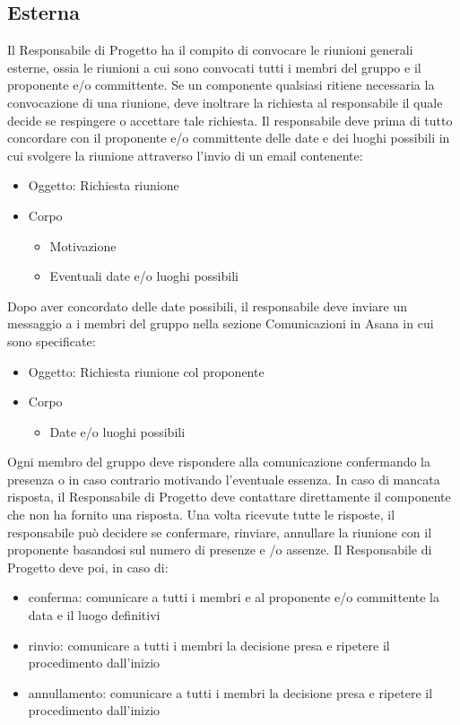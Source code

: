 \documentclass[a4paper]{report}
\begin{document}
		\subsection{Esterna}
			Il Responsabile di Progetto ha il compito di convocare le riunioni generali esterne, ossia
			le riunioni a cui sono convocati tutti i membri del gruppo e il proponente e/o committente.
			Se un componente qualsiasi ritiene necessaria la convocazione di una riunione, deve
			inoltrare la richiesta al responsabile il quale decide se respingere o accettare
			tale richiesta.
			Il responsabile deve prima di tutto concordare con il proponente e/o committente delle date e dei luoghi
			possibili in cui svolgere la riunione attraverso l'invio di un email contenente:
			\begin{itemize}
				\item Oggetto: Richiesta riunione
				\item Corpo
				\begin{itemize}
					\item Motivazione
					\item Eventuali date e/o luoghi possibili
				\end{itemize}
			\end{itemize}
			Dopo aver concordato delle date possibili, il responsabile deve inviare un messaggio a
			i membri del gruppo nella sezione Comunicazioni in Asana in cui sono specificate:
			\begin{itemize}
				\item Oggetto: Richiesta riunione col proponente
				\item Corpo
				\begin{itemize}
					\item Date e/o luoghi possibili
				\end{itemize}
			\end{itemize}
			Ogni membro del gruppo deve rispondere alla comunicazione confermando la presenza o in
			caso contrario motivando l'eventuale essenza. In caso di mancata risposta, il Responsabile
			di Progetto deve contattare direttamente il componente che non ha fornito una risposta.
			Una volta ricevute tutte le risposte, il responsabile può decidere se confermare, rinviare,
			annullare la riunione con il proponente basandosi sul numero di presenze e /o assenze.
			Il Responsabile di Progetto deve poi, in caso di:
			\begin{itemize}
				\item conferma: comunicare a tutti i membri e al proponente e/o committente la data e il luogo definitivi
				\item rinvio: comunicare a tutti i membri la decisione presa e ripetere il procedimento
				dall'inizio
				\item annullamento: comunicare a tutti i membri la decisione presa e ripetere il
				procedimento dall'inizio
			\end{itemize}
\end{document}
